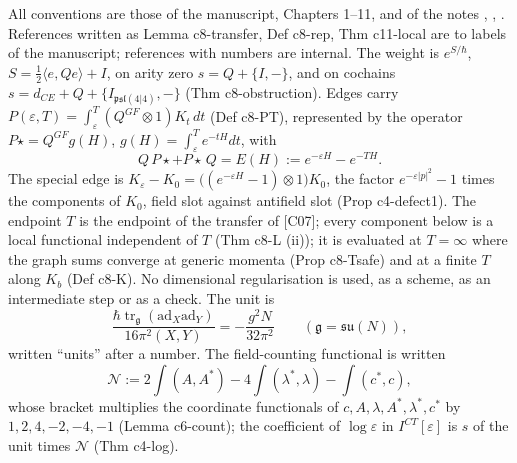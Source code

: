 \documentclass[11pt]{article}
\numberwithin{equation}{section}
\theoremstyle{plain}
\theoremstyle{definition}
\newcommand{\psl}{\mathfrak{psl}(4|4)}
\newcommand{\Pst}{P\star}
\newcommand{\Fc}{\mathcal N}
\begin{document}
All conventions are those of the manuscript, Chapters 1--11, and of the notes , , . References written as Lemma c8-transfer, Def c8-rep, Thm c11-local are to labels of the manuscript; references with numbers are internal. The weight is $e^{S/\hbar}$, $S=\tfrac12\langle e,Qe\rangle+I$, on arity zero $s=Q+\{I,-\}$, and on cochains $s=d_{CE}+Q+\{I_{\psl},-\}$ (Thm c8-obstruction). Edges carry $P(\varepsilon,T)=\int_\varepsilon^T(Q^{GF}\otimes1)K_t\,dt$ (Def c8-PT), represented by the operator $\Pst=Q^{GF}g(H)$, $g(H)=\int_\varepsilon^Te^{-tH}dt$, with
\begin{equation}
Q\,\Pst+\Pst\,Q=E(H):=e^{-\varepsilon H}-e^{-TH}.
\label{eq:op-QP}
\end{equation}
The special edge is $K_\varepsilon-K_0=\big((e^{-\varepsilon H}-1)\otimes1\big)K_0$, the factor $e^{-\varepsilon|p|^2}-1$ times the components of $K_0$, field slot against antifield slot (Prop c4-defect1). The endpoint $T$ is the endpoint of the transfer of [C07]; every component below is a local functional independent of $T$ (Thm c8-L (ii)); it is evaluated at $T=\infty$ where the graph sums converge at generic momenta (Prop c8-Tsafe) and at a finite $T$ along $K_b$ (Def c8-K). No dimensional regularisation is used, as a scheme, as an intermediate step or as a check. The unit is
\[
\frac{\hbar\operatorname{tr}_{\mathfrak g}(\mathrm{ad}_X\mathrm{ad}_Y)}{16\pi^2(X,Y)}=-\frac{g^2N}{32\pi^2}\qquad(\mathfrak g=\mathfrak{su}(N)),
\]
written ``units'' after a number. The field-counting functional is written
\[
\Fc:=2\int(A,A^*)-4\int(\lambda^*,\lambda)-\int(c^*,c),
\]
whose bracket multiplies the coordinate functionals of $c,A,\lambda,A^*,\lambda^*,c^*$ by $1,2,4,-2,-4,-1$ (Lemma c6-count); the coefficient of $\log\varepsilon$ in $I^{CT}[\varepsilon]$ is $s$ of the unit times $\Fc$ (Thm c4-log).
\end{document}
